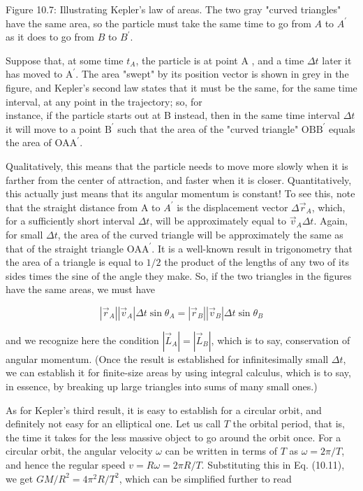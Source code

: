 \documentclass[10pt]{article}
\begin{document}
Figure 10.7: Illustrating Kepler's law of areas. The two gray "curved triangles" have the same area, so the particle must take the same time to go from $A$ to $A^{\prime}$ as it does to go from $B$ to $B^{\prime}$.

Suppose that, at some time $t_{A}$, the particle is at point A , and a time $\Delta t$ later it has moved to $\mathrm{A}^{\prime}$. The area "swept" by its position vector is shown in grey in the figure, and Kepler's second law states that it must be the same, for the same time interval, at any point in the trajectory; so, for\\
instance, if the particle starts out at B instead, then in the same time interval $\Delta t$ it will move to a point $\mathrm{B}^{\prime}$ such that the area of the "curved triangle" $\mathrm{OBB}^{\prime}$ equals the area of $\mathrm{OAA}^{\prime}$.

Qualitatively, this means that the particle needs to move more slowly when it is farther from the center of attraction, and faster when it is closer. Quantitatively, this actually just means that its angular momentum is constant! To see this, note that the straight distance from A to $A^{\prime}$ is the displacement vector $\Delta \vec{r}_{A}$, which, for a sufficiently short interval $\Delta t$, will be approximately equal to $\vec{v}_{A} \Delta t$. Again, for small $\Delta t$, the area of the curved triangle will be approximately the same as that of the straight triangle $\mathrm{OAA}^{\prime}$. It is a well-known result in trigonometry that the area of a triangle is equal to $1 / 2$ the product of the lengths of any two of its sides times the sine of the angle they make. So, if the two triangles in the figures have the same areas, we must have


\begin{equation*}
\left|\vec{r}_{A}\right|\left|\vec{v}_{A}\right| \Delta t \sin \theta_{A}=\left|\vec{r}_{B}\right|\left|\vec{v}_{B}\right| \Delta t \sin \theta_{B} \tag{10.17}
\end{equation*}


and we recognize here the condition $\left|\vec{L}_{A}\right|=\left|\vec{L}_{B}\right|$, which is to say, conservation of angular momentum. (Once the result is established for infinitesimally small $\Delta t$, we can establish it for finite-size areas by using integral calculus, which is to say, in essence, by breaking up large triangles into sums of many small ones.)

As for Kepler's third result, it is easy to establish for a circular orbit, and definitely not easy for an elliptical one. Let us call $T$ the orbital period, that is, the time it takes for the less massive object to go around the orbit once. For a circular orbit, the angular velocity $\omega$ can be written in terms of $T$ as $\omega=2 \pi / T$, and hence the regular speed $v=R \omega=2 \pi R / T$. Substituting this in Eq. (10.11), we get $G M / R^{2}=4 \pi^{2} R / T^{2}$, which can be simplified further to read
\end{document}

